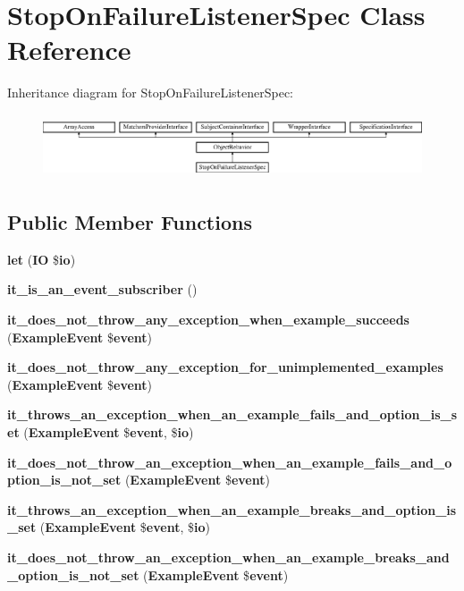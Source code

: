 \section{Stop\+On\+Failure\+Listener\+Spec Class Reference}
\label{classspec_1_1_php_spec_1_1_listener_1_1_stop_on_failure_listener_spec}
Inheritance diagram for Stop\+On\+Failure\+Listener\+Spec\+:\begin{figure}[H]
\begin{center}
\leavevmode
\includegraphics[height=1.909091cm]{classspec_1_1_php_spec_1_1_listener_1_1_stop_on_failure_listener_spec}
\end{center}
\end{figure}
\subsection*{Public Member Functions}
\begin{DoxyCompactItemize}
\item 
{\bf let} ({\bf I\+O} \${\bf io})
\item 
{\bf it\+\_\+is\+\_\+an\+\_\+event\+\_\+subscriber} ()
\item 
{\bf it\+\_\+does\+\_\+not\+\_\+throw\+\_\+any\+\_\+exception\+\_\+when\+\_\+example\+\_\+succeeds} ({\bf Example\+Event} \${\bf event})
\item 
{\bf it\+\_\+does\+\_\+not\+\_\+throw\+\_\+any\+\_\+exception\+\_\+for\+\_\+unimplemented\+\_\+examples} ({\bf Example\+Event} \${\bf event})
\item 
{\bf it\+\_\+throws\+\_\+an\+\_\+exception\+\_\+when\+\_\+an\+\_\+example\+\_\+fails\+\_\+and\+\_\+option\+\_\+is\+\_\+set} ({\bf Example\+Event} \${\bf event}, \${\bf io})
\item 
{\bf it\+\_\+does\+\_\+not\+\_\+throw\+\_\+an\+\_\+exception\+\_\+when\+\_\+an\+\_\+example\+\_\+fails\+\_\+and\+\_\+option\+\_\+is\+\_\+not\+\_\+set} ({\bf Example\+Event} \${\bf event})
\item 
{\bf it\+\_\+throws\+\_\+an\+\_\+exception\+\_\+when\+\_\+an\+\_\+example\+\_\+breaks\+\_\+and\+\_\+option\+\_\+is\+\_\+set} ({\bf Example\+Event} \${\bf event}, \${\bf io})
\item 
{\bf it\+\_\+does\+\_\+not\+\_\+throw\+\_\+an\+\_\+exception\+\_\+when\+\_\+an\+\_\+example\+\_\+breaks\+\_\+and\+\_\+option\+\_\+is\+\_\+not\+\_\+set} ({\bf Example\+Event} \${\bf event})
\end{DoxyCompactItemize}
